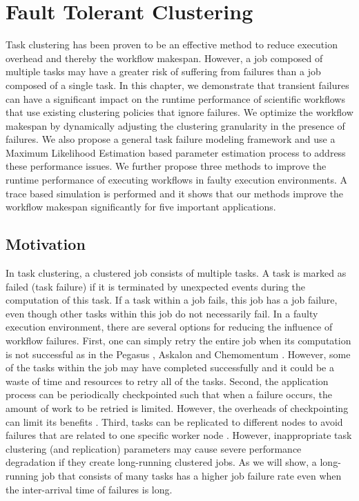 \chapter{Fault Tolerant Clustering}
\label{chap:tolerance}

Task clustering has been proven to be an effective method to reduce execution overhead and thereby the workflow makespan. However, a job composed of multiple tasks may have a greater risk of suffering from failures than a job composed of a single task. In this chapter, we demonstrate that transient failures can have a significant impact on the runtime performance of scientific workflows that use existing clustering policies that ignore failures. We optimize the workflow makespan by dynamically adjusting the clustering granularity in the presence of failures. We also propose a general task failure modeling framework and use a Maximum Likelihood Estimation based parameter estimation process to address these performance issues. We further propose three methods to improve the runtime performance of executing workflows in faulty execution environments. A trace based simulation is performed and it shows that our methods improve the workflow makespan significantly for five important applications.    

\section{Motivation}


In task clustering, a clustered job consists of multiple tasks. A task is marked as failed (task failure) if it is terminated by unexpected events during the computation of this task. If a task within a job fails, this job has a job failure, even though other tasks within this job do not necessarily fail. 
In a faulty execution environment, there are several options for reducing the influence of workflow failures. First, one can simply retry the entire job when its computation is not successful as in the Pegasus \cite{Deelman2004}, Askalon \cite{fahringer2007askalon} and Chemomentum \cite{schuller2008chemomentum}. However, some of the tasks within the job may have completed successfully and it could be a waste of time and resources to retry all of the tasks. Second, the application process can be periodically checkpointed such that when a failure occurs, the amount of work to be retried is limited. However, the overheads of checkpointing can limit its benefits \cite{Zhang2004}. Third, tasks can be replicated to different nodes to avoid failures that are related to one specific worker node \cite{Plankensteiner2009}. However, inappropriate task clustering (and replication) parameters may cause severe performance degradation if they create long-running clustered jobs. As we will show, a long-running job that consists of many tasks has a higher job failure rate even when the inter-arrival time of failures is long. 

